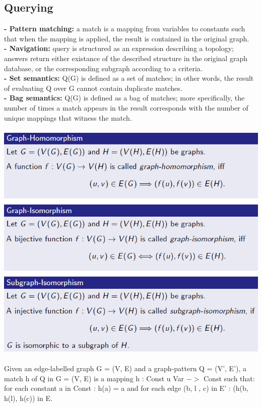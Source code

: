 \documentclass{article}
\begin{document}
\subsection{Querying}
\textbf{- Pattern matching:} a match is a mapping from variables to constants such that when the mapping is applied, the result is contained in the original graph.\\
\textbf{- Navigation:} query is structured as an expression describing a topology; answers return either existance of the described structure in the original graph database, or the corresponding subgraph according to a criteria.\\
\textbf{- Set semantics:} Q(G) is defined as a set of matches; in other words, the result of evaluating Q over G cannot contain duplicate matches.\\
\textbf{- Bag semantics:} Q(G) is defined as a bag of matches; more specifically, the number of times a match appears in the result corresponds with the number of unique mappings that witness the match.\\\\
\includegraphics[scale=0.6]{23.png}\\\\
Given an edge-labelled graph G = (V, E) and a graph-pattern Q = (V', E'), a match h of Q in G = (V, E) is a mapping h : Const u Var $->$ Const such that:\\
for each constant a in Const : h(a) = a and for each edge (b, l , c) in E' : (h(b, h(l), h(c)) in E.\\
\end{document}
